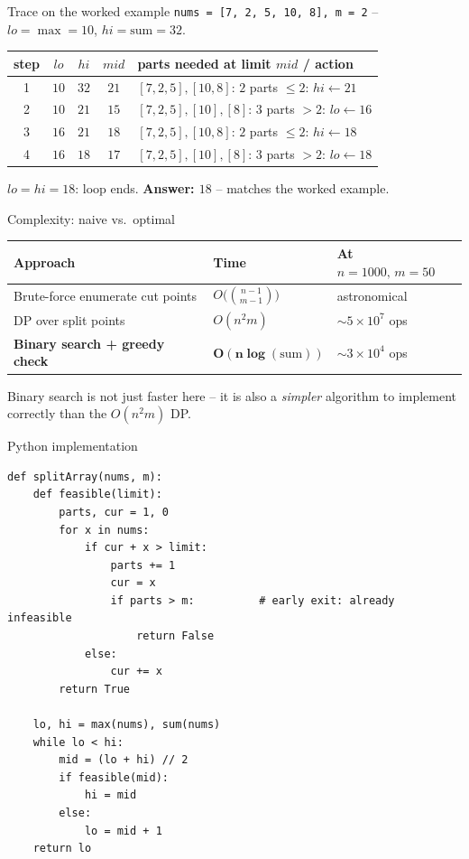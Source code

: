 \documentclass[11pt,aspectratio=169]{beamer}
\begin{document}
\begin{frame}{Trace on the worked example}
  \small
  \texttt{nums = [7, 2, 5, 10, 8], m = 2} -- $lo = \max = 10$, $hi = \mathrm{sum} = 32$.
  \begin{center}
  \begin{tabular}{@{}ccccl@{}}
    \toprule
    step & $lo$ & $hi$ & $mid$ & parts needed at limit $mid$ / action \\
    \midrule
    1 & $10$ & $32$ & $21$ & $[7,2,5],[10,8]$: $2$ parts $\le 2$: $hi \gets 21$ \\
    2 & $10$ & $21$ & $15$ & $[7,2,5],[10],[8]$: $3$ parts $> 2$: $lo \gets 16$ \\
    3 & $16$ & $21$ & $18$ & $[7,2,5],[10,8]$: $2$ parts $\le 2$: $hi \gets 18$ \\
    4 & $16$ & $18$ & $17$ & $[7,2,5],[10],[8]$: $3$ parts $> 2$: $lo \gets 18$ \\
    \bottomrule
  \end{tabular}
  \end{center}
  $lo = hi = 18$: loop ends. \textbf{Answer: $18$} -- matches the worked example.
\end{frame}

\begin{frame}{Complexity: naive vs.\ optimal}
  \begin{center}
  \begin{tabular}{@{}lll@{}}
    \toprule
    Approach & Time & At $n=1000,\,m=50$ \\
    \midrule
    Brute-force enumerate cut points & $O\big(\binom{n-1}{m-1}\big)$ & astronomical \\
    DP over split points & $O(n^2 m)$ & $\sim 5\times 10^7$ ops \\
    \textbf{Binary search + greedy check} & $\boldsymbol{O(n\log(\mathrm{sum}))}$ &
    $\sim 3\times 10^4$ ops \\
    \bottomrule
  \end{tabular}
  \end{center}
  Binary search is not just faster here -- it is also a \emph{simpler} algorithm to
  implement correctly than the $O(n^2m)$ DP.
\end{frame}

\begin{frame}[fragile]{Python implementation}
  \begin{lstlisting}[style=py]
def splitArray(nums, m):
    def feasible(limit):
        parts, cur = 1, 0
        for x in nums:
            if cur + x > limit:
                parts += 1
                cur = x
                if parts > m:          # early exit: already infeasible
                    return False
            else:
                cur += x
        return True

    lo, hi = max(nums), sum(nums)
    while lo < hi:
        mid = (lo + hi) // 2
        if feasible(mid):
            hi = mid
        else:
            lo = mid + 1
    return lo
  \end{lstlisting}
\end{frame}
\end{document}
